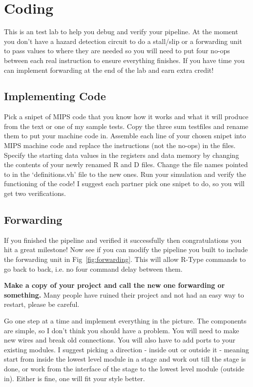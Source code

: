\chapter{Coding}

This is an test lab to help you debug and verify your pipeline.  At the moment you don't have a hazard detection circuit to do a stall/slip or a forwarding unit to pass values to where they are needed so you will need to put four no-ops between each real instruction to ensure everything finishes.  If you have time you can implement forwarding at the end of the lab and earn extra credit!

\section{Implementing Code}
Pick a snipet of MIPS code that you know how it works and what it will produce from the text or one of my sample tests.  Copy the three sum testfiles and rename them to put your machine code in.  Assemble each line of your chosen snipet into MIPS machine code and replace the instructions (not the no-ops) in the files.  Specify the starting data values in the registers and data memory by changing the contents of your newly renamed R and D files.  Change the file names pointed to in the `definitions.vh' file to the new ones.  Run your simulation and verify the functioning of the code!  I suggest each partner pick one snipet to do, so you will get two verifications.

\section{Forwarding}
If you finished the pipeline and verified it successfully then congratulations you hit a great milestone!  Now see if you can modify the pipeline you built to include the forwarding unit in Fig~\ref{fig:forwarding}.  This will allow R-Type commands to go back to back, i.e. no four command delay between them.  

\textbf{Make a copy of your project and call the new one forwarding or something.}  Many people have ruined their project and not had an easy way to restart, please be careful.
  
Go one step at a time and implement everything in the picture.  The components are simple, so I don't think you should have a problem. You will need to make new wires and break old connections.  You will also have to add ports to your existing modules.  I suggest picking a direction - inside out or outside it - meaning start from inside the lowest level module in a stage and work out till the stage is done, or work from the interface of the stage to the lowest level module (outside in).  Either is fine, one will fit your style better. 

